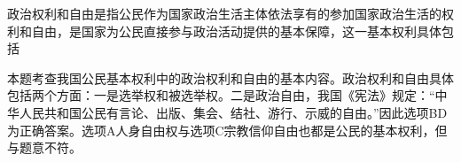 \question 政治权利和自由是指公民作为国家政治生活主体依法享有的参加国家政治生活的权利和自由，是国家为公民直接参与政治活动提供的基本保障，这一基本权利具体包括
\par{}
\begin{solution}本题考查我国公民基本权利中的政治权利和自由的基本内容。政治权利和自由具体包括两个方面：一是选举权和被选举权。二是政治自由，我国《宪法》规定：``中华人民共和国公民有言论、出版、集会、结社、游行、示威的自由。''因此选项BD为正确答案。选项A人身自由权与选项C宗教信仰自由也都是公民的基本权利，但与题意不符。
\end{solution}
